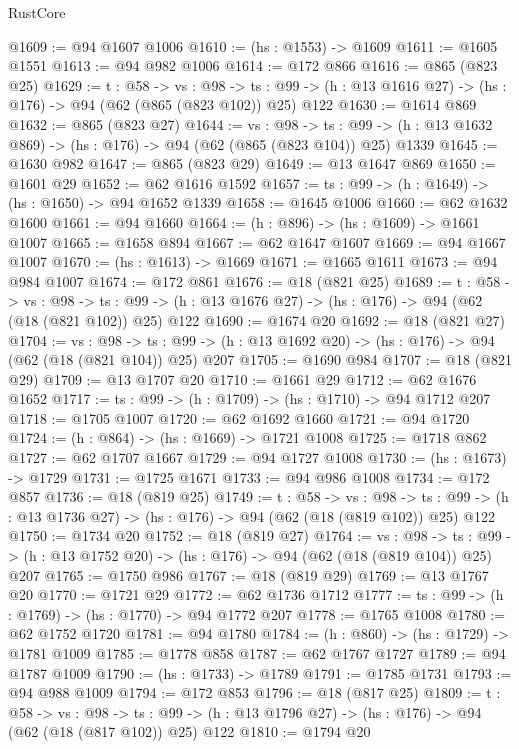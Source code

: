 \begin{lexlean}{RustCore}
\begin{coremodule}
@1609 := @94 @1607 @1006
@1610 := (hs : @1553) -> @1609
@1611 := @1605 @1551
@1613 := @94 @982 @1006
@1614 := @172 @866
@1616 := @865 (@823 @25)
@1629 := {t : @58} ->
  {vs : @98} ->
  {ts : @99} -> (h : @13 @1616 @27) -> (hs : @176) -> @94 (@62 (@865 (@823 @102)) @25) @122
@1630 := @1614 @869
@1632 := @865 (@823 @27)
@1644 := {vs : @98} ->
  {ts : @99} -> (h : @13 @1632 @869) -> (hs : @176) -> @94 (@62 (@865 (@823 @104)) @25) @1339
@1645 := @1630 @982
@1647 := @865 (@823 @29)
@1649 := @13 @1647 @869
@1650 := @1601 @29
@1652 := @62 @1616 @1592
@1657 := {ts : @99} -> (h : @1649) -> (hs : @1650) -> @94 @1652 @1339
@1658 := @1645 @1006
@1660 := @62 @1632 @1600
@1661 := @94 @1660
@1664 := (h : @896) -> (hs : @1609) -> @1661 @1007
@1665 := @1658 @894
@1667 := @62 @1647 @1607
@1669 := @94 @1667 @1007
@1670 := (hs : @1613) -> @1669
@1671 := @1665 @1611
@1673 := @94 @984 @1007
@1674 := @172 @861
@1676 := @18 (@821 @25)
@1689 := {t : @58} ->
  {vs : @98} ->
  {ts : @99} -> (h : @13 @1676 @27) -> (hs : @176) -> @94 (@62 (@18 (@821 @102)) @25) @122
@1690 := @1674 @20
@1692 := @18 (@821 @27)
@1704 := {vs : @98} ->
  {ts : @99} -> (h : @13 @1692 @20) -> (hs : @176) -> @94 (@62 (@18 (@821 @104)) @25) @207
@1705 := @1690 @984
@1707 := @18 (@821 @29)
@1709 := @13 @1707 @20
@1710 := @1661 @29
@1712 := @62 @1676 @1652
@1717 := {ts : @99} -> (h : @1709) -> (hs : @1710) -> @94 @1712 @207
@1718 := @1705 @1007
@1720 := @62 @1692 @1660
@1721 := @94 @1720
@1724 := (h : @864) -> (hs : @1669) -> @1721 @1008
@1725 := @1718 @862
@1727 := @62 @1707 @1667
@1729 := @94 @1727 @1008
@1730 := (hs : @1673) -> @1729
@1731 := @1725 @1671
@1733 := @94 @986 @1008
@1734 := @172 @857
@1736 := @18 (@819 @25)
@1749 := {t : @58} ->
  {vs : @98} ->
  {ts : @99} -> (h : @13 @1736 @27) -> (hs : @176) -> @94 (@62 (@18 (@819 @102)) @25) @122
@1750 := @1734 @20
@1752 := @18 (@819 @27)
@1764 := {vs : @98} ->
  {ts : @99} -> (h : @13 @1752 @20) -> (hs : @176) -> @94 (@62 (@18 (@819 @104)) @25) @207
@1765 := @1750 @986
@1767 := @18 (@819 @29)
@1769 := @13 @1767 @20
@1770 := @1721 @29
@1772 := @62 @1736 @1712
@1777 := {ts : @99} -> (h : @1769) -> (hs : @1770) -> @94 @1772 @207
@1778 := @1765 @1008
@1780 := @62 @1752 @1720
@1781 := @94 @1780
@1784 := (h : @860) -> (hs : @1729) -> @1781 @1009
@1785 := @1778 @858
@1787 := @62 @1767 @1727
@1789 := @94 @1787 @1009
@1790 := (hs : @1733) -> @1789
@1791 := @1785 @1731
@1793 := @94 @988 @1009
@1794 := @172 @853
@1796 := @18 (@817 @25)
@1809 := {t : @58} ->
  {vs : @98} ->
  {ts : @99} -> (h : @13 @1796 @27) -> (hs : @176) -> @94 (@62 (@18 (@817 @102)) @25) @122
@1810 := @1794 @20

\end{coremodule}
\end{lexlean}
